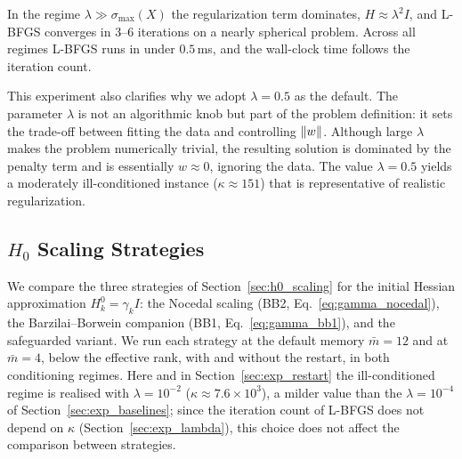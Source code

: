 \noindent In the regime $\lambda \gg \sigma_{\max}(X)$ the regularization term
dominates, $H \approx \lambda^2 I$, and L-BFGS converges in $3$--$6$
iterations on a nearly spherical problem. Across all regimes L-BFGS runs in
under $0.5$\,ms, and the wall-clock time follows the iteration count.

\noindent This experiment also clarifies why we adopt $\lambda = 0.5$ as the
default. The parameter $\lambda$ is not an algorithmic knob but part of the
problem definition: it sets the trade-off between fitting the data and
controlling $\left\|w\right\|$. Although large $\lambda$ makes the problem
numerically trivial, the resulting solution is dominated by the penalty term
and is essentially $w \approx 0$, ignoring the data. The value
$\lambda = 0.5$ yields a moderately ill-conditioned instance
($\kappa \approx 151$) that is representative of realistic regularization.


\subsection{$H_0$ Scaling Strategies}
\label{sec:exp_h0}

\noindent We compare the three strategies of Section~\ref{sec:h0_scaling} for the
initial Hessian approximation $H_k^0 = \gamma_k I$: the Nocedal scaling
(BB2, Eq.~\eqref{eq:gamma_nocedal}), the Barzilai--Borwein companion
(BB1, Eq.~\eqref{eq:gamma_bb1}), and the safeguarded variant. We run each
strategy at the default memory $\bar m = 12$ and at $\bar m = 4$, below the
effective rank, with and without the restart, in both conditioning regimes.
Here and in Section~\ref{sec:exp_restart} the ill-conditioned regime is
realised with $\lambda = 10^{-2}$ ($\kappa \approx 7.6 \times 10^3$), a
milder value than the $\lambda = 10^{-4}$ of
Section~\ref{sec:exp_baselines}; since the iteration count of L-BFGS does not
depend on $\kappa$ (Section~\ref{sec:exp_lambda}), this choice does not
affect the comparison between strategies.

